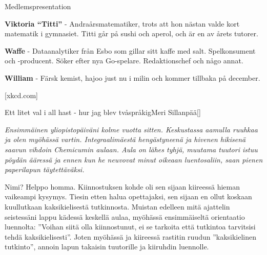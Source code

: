 \documentclass{spektraklet}
\begin{document}
\begin{artikel}{Medlemspresentation}{}
\begin{twocolumns}
\textbf{Viktoria ``Titti''} - Andraårsmatematiker, trots att hon nästan valde kort matematik i gymnasiet. Titti går på sushi och aperol, och är en av årets tutorer.

\textbf{Waffe} - Dataanalytiker från Esbo som gillar sitt kaffe med salt. Spelkonsument och -producent. Söker efter nya Go-spelare. Redaktionschef och någo annat.

\textbf{William} - Färsk kemist, hajoo just nu i milin och kommer tillbaka på december.

\end{twocolumns}

[xkcd.com]
\end{artikel}

\begin{artikel}{Ett litet val i all hast - hur jag blev tvåspråkig}{Meri Sillanpää}[]
\begin{twocolumns}

\textit{Ensimmäinen yliopistopäiväni kolme vuotta sitten. Keskustassa aamulla ruuhkaa ja olen myöhässä vartin. Integraalimäestä hengästyneenä ja hivenen hikisenä saavun vihdoin Chemicumin aulaan. Aula on lähes tyhjä, muutama tuutori istuu pöydän ääressä ja ennen kun he neuvovat minut oikeaan luentosaliin, saan pienen paperilapun täytettäväksi.}
 
\vspace{0.2cm}
\noindent{}
\vspace{0.2cm}


Nimi? Helppo homma. Kiinnostuksen kohde oli sen sijaan kiireessä hieman vaikeampi kysymys. Tiesin etten halua opettajaksi, sen sijaan en ollut koskaan kuullutkaan kaksikielisestä tutkinnosta. Muistan edelleen mitä ajattelin seistessäni lappu kädessä keskellä aulaa, myöhässä ensimmäiseltä orientaatio luennolta: ”Voihan siitä olla kiinnostunut, ei se tarkoita että tutkintoa tarvitsisi tehdä kaksikielisesti”. Joten myöhässä ja kiireessä rastitin ruudun ”kaksikielinen tutkinto”, annoin lapun takaisin tuutorille ja kiiruhdin luennolle.


\end{twocolumns}
\end{artikel}
\end{document}
